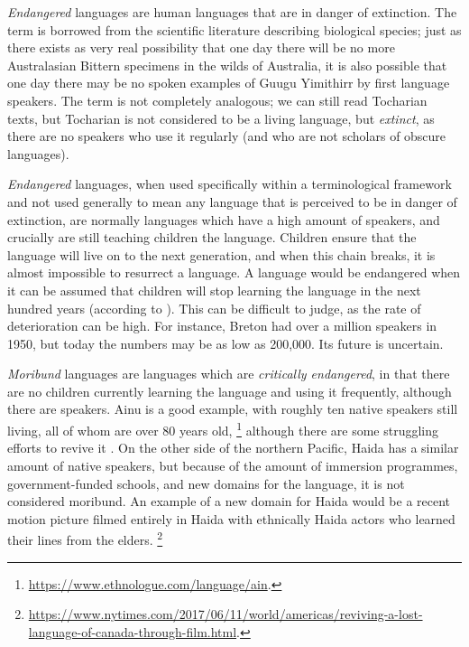\emph{Endangered} languages are human languages that are in danger of extinction. The term is borrowed from the scientific literature describing biological species; just as there exists as very real possibility that one day there will be no more Australasian Bittern specimens in the wilds of Australia, it is also possible that one day there may be no spoken examples of Guugu Yimithirr by first language speakers. The term is not completely analogous; we can still read Tocharian texts, but Tocharian is not considered to be a living language, but \textit{extinct}, as there are no speakers who use it regularly (and who are not scholars of obscure languages).

{\it Endangered} languages, when used specifically within a terminological framework and not used generally to mean any language that is perceived to be in danger of extinction, are normally languages which have a high amount of speakers, and crucially are still teaching children the language. Children ensure that the language will live on to the next generation, and when this chain breaks, it is almost impossible to resurrect a language. A language would be endangered when it can be assumed that children will stop learning the language in the next hundred years (according to \citet{krauss92}). This can be difficult to judge, as the rate of deterioration can be high. For instance, Breton had over a million speakers in 1950, but today the numbers may be as low as 200,000. Its future is uncertain.

\emph{Moribund} languages are languages which are {\it critically endangered}, in that there are no children currently learning the language and using it frequently, although there are speakers. Ainu is a good example, with roughly ten native speakers still living, all of whom are over 80 years old, \footnote{\href{https://www.ethnologue.com/language/ain}{https://www.ethnologue.com/language/ain}. } although there are some struggling efforts to revive it \citep{hanks2017policy}. On the other side of the northern Pacific, Haida has a similar amount of native speakers, but because of the amount of immersion programmes, government-funded schools, and new domains for the language, it is not considered moribund. An example of a new domain for Haida would be a recent motion picture filmed entirely in Haida with ethnically Haida actors who learned their lines from the elders. \footnote{\href{https://www.nytimes.com/2017/06/11/world/americas/reviving-a-lost-language-of-canada-through-film.html}{https://www.nytimes.com/2017/06/11/world/americas/reviving-a-lost-language-of-canada-through-film.html}. }

